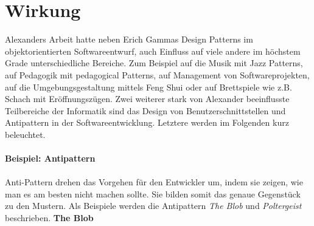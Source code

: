 \documentclass[fontsize=11pt,a4paper,final]{scrreprt}[2003/01/01]
\begin{document}
\section{Wirkung}
Alexanders Arbeit hatte neben Erich Gammas Design Patterns im objektorientierten Softwareentwurf, auch Einfluss auf viele andere im höchstem Grade unterschiedliche Bereiche. Zum Beispiel auf die Musik mit Jazz Patterns, auf Pedagogik mit pedagogical Patterns, auf Management von Softwareprojekten, auf die Umgebungsgestaltung mittels Feng Shui oder auf Brettspiele wie z.B. Schach mit Eröffnungszügen. Zwei weiterer stark von Alexander beeinflusste Teilbereiche der Informatik sind das Design von Benutzerschnittstellen und Antipattern in der Softwareentwicklung. Letztere werden im Folgenden kurz beleuchtet. \\ \\
\textbf{Beispiel: Antipattern} \\ \\
Anti-Pattern drehen das Vorgehen für den Entwickler um, indem sie zeigen, wie man es am besten nicht machen sollte. Sie bilden somit das genaue Gegenstück zu den Mustern. Als Beispiele werden die Antipattern \textit{The Blob} und \textit{Poltergeist} beschrieben. \newpage
\textbf{The Blob \cite[S. 42 - 48]{Brown1998}}
\end{document}
